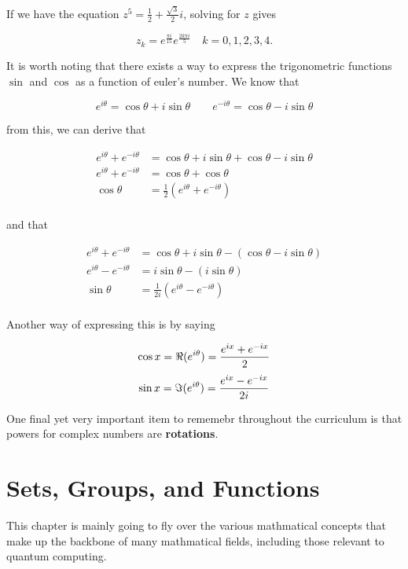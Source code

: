 \documentclass[12pt]{article}
\begin{document}
\begin{example}
    If we have the equation $z^5=\frac{1}{2}+\frac{\sqrt{3}}{2}i$, solving for $z$ gives

    $$
    z_k = e^{\frac{\pi i}{15}} e^{\frac{2k\pi i}{5}}
    \quad k=0,1,2,3,4.
    $$
\end{example}

It is worth noting that there exists a way to express the trigonometric functions $\sin$ and $\cos$ as a function of euler's number. We know that 

$$
e^{i\theta} = \cos \theta + i \sin \theta \qquad e^{-i\theta} = \cos \theta - i \sin \theta
$$

from this, we can derive that 

\begin{align*}
    e^{i\theta} + e^{-i\theta} &= \cos \theta + i \sin \theta + \cos \theta - i \sin \theta \\
    e^{i\theta} + e^{-i\theta} &= \cos \theta + \cos \theta\\
    \cos \theta &= \frac{1}{2}\left(e^{i\theta} + e^{-i\theta}\right)\\
\end{align*}

and that 

\begin{align*}
    e^{i\theta} + e^{-i\theta} &= \cos \theta + i \sin \theta - (\cos \theta - i \sin \theta) \\
    e^{i\theta} - e^{-i\theta} &= i \sin \theta - \left(i \sin \theta\right)\\
    \sin \theta &= \frac{1}{2i}\left(e^{i\theta} - e^{-i\theta}\right)\\
\end{align*}

Another way of expressing this is by saying

$$
\cos x = \real(e^{i\theta}) = \frac{e^{ix} + e^{-ix}}{2}
$$
$$
\sin x = \imaginary(e^{i\theta}) = \frac{e^{ix} - e^{-ix}}{2i}
$$


One final yet very important item to rememebr throughout the curriculum is that powers for complex numbers are \textbf{rotations}.

\break

\section{Sets, Groups, and Functions}

This chapter is mainly going to fly over the various mathmatical concepts that make up the backbone of many mathmatical fields, including those relevant to quantum computing. 
\end{document}
